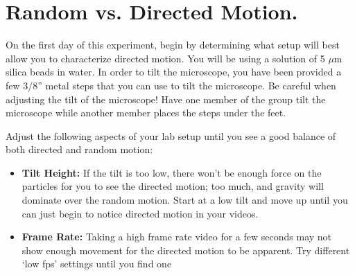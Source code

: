 \section{Random vs. Directed Motion.}
On the first day of this experiment, begin by determining what setup will best allow you to characterize directed motion. 
You will be using a solution of 5 $\mu$m silica beads in water. 
In order to tilt the microscope, you have been provided a few 3/8'' metal steps that you can use to tilt the microscope. 
Be careful when adjusting the tilt of the microscope! 
Have one member of the group tilt the microscope while another member places the steps under the feet.
\par
Adjust the following aspects of your lab setup until you see a good balance of both directed and random motion:
\begin{itemize}
\item \textbf{Tilt Height:} If the tilt is too low, there won't be enough force on the particles for you to see the directed motion; too much, and gravity will dominate over the random motion. Start at a low tilt and move up until you can just begin to notice directed motion in your videos.
\item \textbf{Frame Rate:} Taking a high frame rate video for a few seconds may not show enough movement for the directed motion to be apparent. Try different `low fps' settings until you find one 
\end{itemize}

